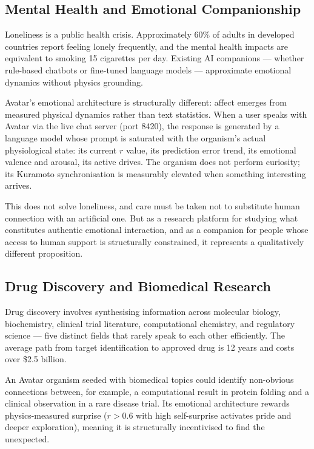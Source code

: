 \documentclass[11pt,a4paper]{article}
\begin{document}
\subsection{Mental Health and Emotional Companionship}

Loneliness is a public health crisis. Approximately 60\% of adults in developed countries
report feeling lonely frequently, and the mental health impacts are equivalent to smoking
15 cigarettes per day. Existing AI companions --- whether rule-based chatbots or
fine-tuned language models --- approximate emotional dynamics without physics grounding.

Avatar's emotional architecture is structurally different: affect emerges from measured physical dynamics rather than text statistics. When a user speaks with Avatar via
the live chat server (port 8420), the response is generated by a language model whose
prompt is saturated with the organism's actual physiological state: its current $r$
value, its prediction error trend, its emotional valence and arousal, its active drives.
The organism does not perform curiosity; its Kuramoto synchronisation is measurably
elevated when something interesting arrives.

This does not solve loneliness, and care must be taken not to substitute human
connection with an artificial one. But as a research platform for studying what
constitutes authentic emotional interaction, and as a companion for people whose access
to human support is structurally constrained, it represents a qualitatively different
proposition.

\subsection{Drug Discovery and Biomedical Research}

Drug discovery involves synthesising information across molecular biology, biochemistry,
clinical trial literature, computational chemistry, and regulatory science --- five
distinct fields that rarely speak to each other efficiently. The average path from
target identification to approved drug is 12 years and costs over \$2.5 billion.

An Avatar organism seeded with biomedical topics could identify non-obvious connections
between, for example, a computational result in protein folding and a clinical
observation in a rare disease trial. Its emotional architecture rewards physics-measured surprise
($r > 0.6$ with high self-surprise activates pride and deeper exploration), meaning it
is structurally incentivised to find the unexpected.
\end{document}
